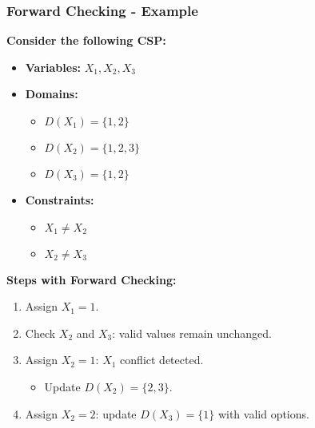 \documentclass[aspectratio=169]{beamer}
\begin{document}
\begin{frame}[fragile]
    \frametitle{Forward Checking - Example}
    \textbf{Consider the following CSP:}
    
    \begin{itemize}
        \item \textbf{Variables:} \(X_1, X_2, X_3\)
        \item \textbf{Domains:}
        \begin{itemize}
            \item \(D(X_1) = \{1, 2\}\)
            \item \(D(X_2) = \{1, 2, 3\}\)
            \item \(D(X_3) = \{1, 2\}\)
        \end{itemize}
        \item \textbf{Constraints:}
        \begin{itemize}
            \item \(X_1 \neq X_2\)
            \item \(X_2 \neq X_3\)
        \end{itemize}
    \end{itemize}

    \vspace{0.5cm}
    
    \textbf{Steps with Forward Checking:}
    \begin{enumerate}
        \item Assign \(X_1 = 1\).
        \item Check \(X_2\) and \(X_3\): valid values remain unchanged.
        \item Assign \(X_2 = 1\): \(X_1\) conflict detected.
        \begin{itemize}
            \item Update \(D(X_2) = \{2, 3\}\).
        \end{itemize}
        \item Assign \(X_2 = 2\): update \(D(X_3) = \{1\}\) with valid options.
    \end{enumerate}
\end{frame}
\end{document}

